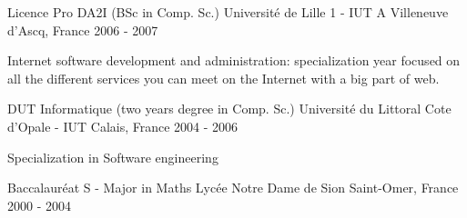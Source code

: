 


\begin{cventries}

\cventry
{Licence Pro DA2I (BSc in Comp. Sc.)} %
{Université de Lille 1 - IUT A} %
{Villeneuve d'Ascq, France} %
{2006 - 2007} %
{ %
\begin{cvitems}
\item {Internet software development and administration: specialization year focused on all the different services you can meet on the Internet with a big part of web.}
\end{cvitems}
}

\cventry
{DUT Informatique (two years degree in Comp. Sc.)} %
{Université du Littoral Cote d'Opale - IUT } %
{Calais, France} %
{2004 - 2006} %
{ %
\begin{cvitems}
\item {Specialization in Software engineering}
\end{cvitems}
}

\cventry
{Baccalauréat S - Major in Maths} %
{Lycée Notre Dame de Sion} %
{Saint-Omer, France} %
{2000 - 2004} %
{ %
\begin{cvitems}
\end{cvitems}
}
\end{cventries}
